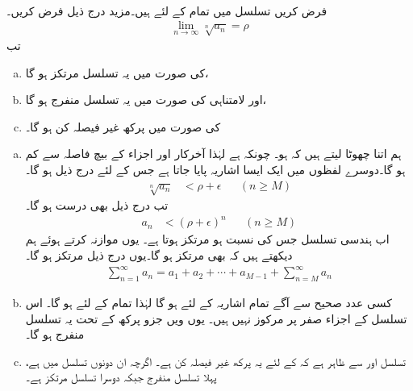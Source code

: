 \\
فرض کریں تسلسل  میں تمام  کے لئے  ہیں۔مزید درج ذیل فرض کریں۔
\begin{align*}
\lim_{n\to\infty}\sqrt[n]{a_n}=\rho
\end{align*}
تب
\begin{enumerate}[a.]
\item
{} کی صورت میں یہ تسلسل مرتکز ہو گا،
\item
{} اور لامتناہی   کی صورت میں یہ تسلسل منفرج ہو گا،
\item
{} کی صورت میں پرکھ غیر فیصلہ کن ہو گا۔
\end{enumerate}
\begin{enumerate}[a.]
\item
{}
\quad
ہم  اتنا چھوٹا لیتے ہیں کہ  ہو۔ چونکہ  ہے لہٰذا آخرکار  اور اجزاء  کے بیچ  فاصلہ  سے کم ہو گا۔دوسرے لفظوں میں ایک ایسا اشاریہ  پایا جاتا ہے جس کے لئے درج ذیل ہو گا۔
\begin{align*}
\sqrt[n]{a_n}&<\rho+\epsilon&& (n\ge M)
\end{align*}
تب درج ذیل بھی درست ہو گا۔
\begin{align*}
a_n&<(\rho+\epsilon)^n&&(n\ge M)
\end{align*}
اب ہندسی تسلسل  جس کی نسبت  ہو مرتکز ہوتا ہے۔ یوں موازنہ کرتے ہوئے ہم دیکھتے ہیں کہ  بھی مرتکز ہو گا۔یوں درج ذیل مرتکز ہو گا۔
\begin{align*}
\sum_{n=1}^{\infty}a_n=a_1+a_2+\cdots+a_{M-1}+\sum_{n=M}^{\infty}a_n
\end{align*}
\item
{}
\quad
کسی عدد صحیح  سے آگے تمام اشاریہ کے لئے   ہو گا لہٰذا تمام  کے لئے  ہو گا۔ اس تسلسل کے اجزاء صفر پر مرکوز نہیں ہیں۔ یوں  ویں جزو پرکھ کے تحت یہ تسلسل منفرج ہو گا۔
\item
{}
\quad
تسلسل  اور  سے ظاہر ہے کہ  کے لئے یہ پرکھ غیر فیصلہ کن ہے۔ اگرچہ ان دونوں تسلسل میں  ہے،   پہلا تسلسل منفرج جبکہ دوسرا تسلسل مرتکز ہے۔
\end{enumerate}

